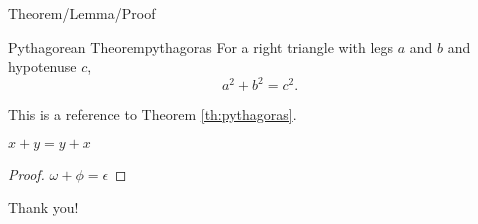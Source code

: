 \begin{frame}{Theorem/Lemma/Proof}
	\begin{theo}{Pythagorean Theorem}{pythagoras}
		For a right triangle with legs $a$ and $b$ and hypotenuse $c$,
		\[
		a^2 + b^2 = c^2. 
		\]
	\end{theo}
	This is a reference to Theorem \ref{th:pythagoras}.
    \begin{lem}
    $ x + y = y + x  $
    \end{lem}
    \begin{proof}
    $\omega +\phi = \epsilon $
    \end{proof}
\end{frame}

\begin{frame}[standout]
Thank you!
\end{frame}

\begin{frame}[allowframebreaks]
	\printbibliography
\end{frame}

